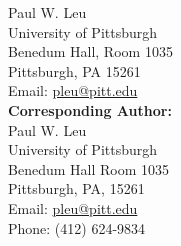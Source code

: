 \documentclass[11pt]{letter}
\begin{document}
Paul W. Leu\\
University of Pittsburgh \\
Benedum Hall, Room 1035 \\
Pittsburgh, PA 15261\\
Email:  \href{mailto:pleu@pitt.edu}{pleu@pitt.edu}\\

\textbf{Corresponding Author:}\\
Paul W. Leu\\
University of Pittsburgh \\
Benedum Hall Room 1035 \\
Pittsburgh, PA, 15261\\
Email:  \href{mailto:pleu@pitt.edu}{pleu@pitt.edu}\\
Phone: (412) 624-9834

\end{document}
